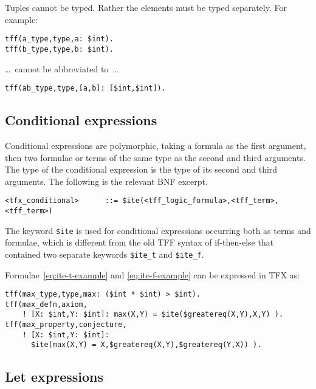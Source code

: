 \documentclass{easychair}
\begin{document}
Tuples cannot be typed. Rather the elements must be typed separately. 
For example:
\begin{verbatim}
tff(a_type,type,a: $int).
tff(b_type,type,b: $int).
\end{verbatim}
\ldots~cannot be abbreviated to~\ldots
\begin{verbatim}
tff(ab_type,type,[a,b]: [$int,$int]).
\end{verbatim}

\subsection{Conditional expressions}

Conditional expressions are polymorphic, taking a formula as the first 
argument, then two formulae or terms of the same type as the second and 
third arguments. 
The type of the conditional expression is the type of its second and third 
arguments. 
The following is the relevant BNF excerpt.
\begin{verbatim}
<tfx_conditional>      ::= $ite(<tff_logic_formula>,<tff_term>,<tff_term>)
\end{verbatim}
The keyword \verb'$ite' is used for conditional expressions occurring both as
terms and formulae, which is different from the old TFF syntax of if-then-else
that contained two separate keywords \verb'$ite_t' and \verb'$ite_f'.

Formulae~\ref{eq:ite-t-example} and \ref{eq:ite-f-example} can be expressed in
TFX as:
\begin{verbatim}
tff(max_type,type,max: ($int * $int) > $int).
tff(max_defn,axiom,
    ! [X: $int,Y: $int]: max(X,Y) = $ite($greatereq(X,Y),X,Y) ).
tff(max_property,conjecture,
    ! [X: $int,Y: $int]: 
      $ite(max(X,Y) = X,$greatereq(X,Y),$greatereq(Y,X)) ).
\end{verbatim}

\subsection{Let expressions}
\end{document}
